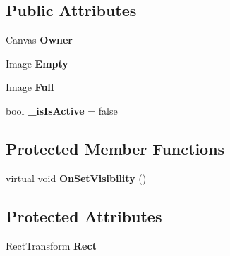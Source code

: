 \subsection*{Public Attributes}
\begin{DoxyCompactItemize}
\item 
\hypertarget{class_skyrates_1_1_u_i_1_1_u_i_state_cooldown_3_01_t_01_4_a4d58720f0cc4a016d95b79027c5e0178}{Canvas {\bfseries Owner}}\label{class_skyrates_1_1_u_i_1_1_u_i_state_cooldown_3_01_t_01_4_a4d58720f0cc4a016d95b79027c5e0178}

\item 
\hypertarget{class_skyrates_1_1_u_i_1_1_u_i_state_cooldown_3_01_t_01_4_adadcc8bd4729c16a176d072ceb198606}{Image {\bfseries Empty}}\label{class_skyrates_1_1_u_i_1_1_u_i_state_cooldown_3_01_t_01_4_adadcc8bd4729c16a176d072ceb198606}

\item 
\hypertarget{class_skyrates_1_1_u_i_1_1_u_i_state_cooldown_3_01_t_01_4_aec87c37028e18ccdf49cacb1067c16ca}{Image {\bfseries Full}}\label{class_skyrates_1_1_u_i_1_1_u_i_state_cooldown_3_01_t_01_4_aec87c37028e18ccdf49cacb1067c16ca}

\item 
\hypertarget{class_skyrates_1_1_u_i_1_1_u_i_state_cooldown_3_01_t_01_4_a1df77fa1980875c70beb8aa0aed4d74f}{bool {\bfseries \-\_\-is\-Is\-Active} = false}\label{class_skyrates_1_1_u_i_1_1_u_i_state_cooldown_3_01_t_01_4_a1df77fa1980875c70beb8aa0aed4d74f}

\end{DoxyCompactItemize}
\subsection*{Protected Member Functions}
\begin{DoxyCompactItemize}
\item 
\hypertarget{class_skyrates_1_1_u_i_1_1_u_i_state_cooldown_3_01_t_01_4_a691441b4ceb07b511f1da70f7ea39ac0}{virtual void {\bfseries On\-Set\-Visibility} ()}\label{class_skyrates_1_1_u_i_1_1_u_i_state_cooldown_3_01_t_01_4_a691441b4ceb07b511f1da70f7ea39ac0}

\end{DoxyCompactItemize}
\subsection*{Protected Attributes}
\begin{DoxyCompactItemize}
\item 
\hypertarget{class_skyrates_1_1_u_i_1_1_u_i_state_cooldown_3_01_t_01_4_a722b57374878edeaa2ba6dd3f7cfb783}{Rect\-Transform {\bfseries Rect}}\label{class_skyrates_1_1_u_i_1_1_u_i_state_cooldown_3_01_t_01_4_a722b57374878edeaa2ba6dd3f7cfb783}

\end{DoxyCompactItemize}
